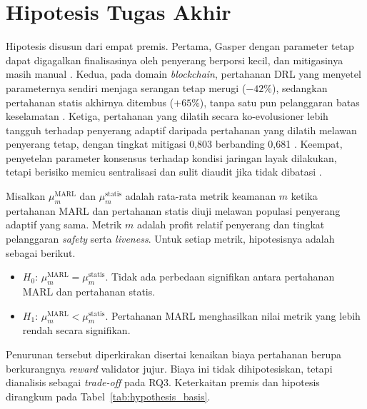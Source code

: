 \section{Hipotesis Tugas Akhir}
\label{sec:hipotesis}
Hipotesis disusun dari empat premis. Pertama, Gasper dengan parameter tetap dapat digagalkan finalisasinya oleh penyerang berporsi kecil, dan mitigasinya masih manual \parencite{laneve2025stochastic}. Kedua, pada domain \textit{blockchain}, pertahanan DRL yang menyetel parameternya sendiri menjaga serangan tetap merugi ($-42\%$), sedangkan pertahanan statis akhirnya ditembus ($+65\%$), tanpa satu pun pelanggaran batas keselamatan \parencite{skowronski2026adaptive}. Ketiga, pertahanan yang dilatih secara ko-evolusioner lebih tangguh terhadap penyerang adaptif daripada pertahanan yang dilatih melawan penyerang tetap, dengan tingkat mitigasi 0,803 berbanding 0,681 \parencite{wushishi2026coadam}. Keempat, penyetelan parameter konsensus terhadap kondisi jaringan layak dilakukan, tetapi berisiko memicu sentralisasi dan sulit diaudit jika tidak dibatasi \parencite{rizal2025enhancing}.

Misalkan $\mu_m^{\text{MARL}}$ dan $\mu_m^{\text{statis}}$ adalah rata-rata metrik keamanan $m$ ketika pertahanan MARL dan pertahanan statis diuji melawan populasi penyerang adaptif yang sama. Metrik $m$ adalah profit relatif penyerang dan tingkat pelanggaran \textit{safety} serta \textit{liveness}. Untuk setiap metrik, hipotesisnya adalah sebagai berikut.
\begin{itemize}
	\item $H_0$: $\mu_m^{\text{MARL}} = \mu_m^{\text{statis}}$. Tidak ada perbedaan signifikan antara pertahanan MARL dan pertahanan statis.
	\item $H_1$: $\mu_m^{\text{MARL}} < \mu_m^{\text{statis}}$. Pertahanan MARL menghasilkan nilai metrik yang lebih rendah secara signifikan.
\end{itemize}
Penurunan tersebut diperkirakan disertai kenaikan biaya pertahanan berupa berkurangnya \textit{reward} validator jujur. Biaya ini tidak dihipotesiskan, tetapi dianalisis sebagai \textit{trade-off} pada RQ3. Keterkaitan premis dan hipotesis dirangkum pada Tabel~\ref{tab:hypothesis_basis}.

